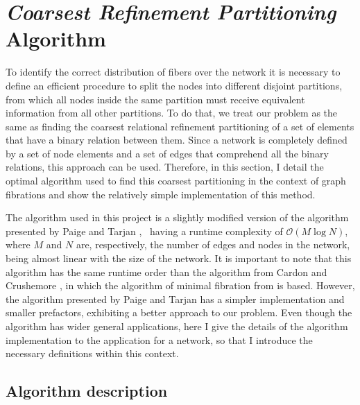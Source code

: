 \documentclass[12pt]{diazessay} %
\begin{document}

\section{\textit{Coarsest Refinement Partitioning }Algorithm}

To identify the correct distribution of fibers over the network it is necessary to define an efficient procedure to split the nodes into different disjoint partitions, from which all nodes inside the same partition must receive equivalent information from all other partitions. To do that, we treat our problem as the same as finding the coarsest relational refinement partitioning of a set of elements that have a binary relation between them. Since a network is completely defined by a set of node elements and a set of edges that comprehend all the binary relations, this approach can be used. Therefore, in this section, I detail the optimal algorithm used to find this coarsest partitioning in the context of graph fibrations and show the relatively simple implementation of this method.

The algorithm used in this project is a slightly modified version of the algorithm presented by Paige and Tarjan \cite{Tarjan1987}, \ having a runtime complexity of $\mathcal{O}(M\log N)$, where $M$ and $N$ are, respectively, the number of edges and nodes in the network, being almost linear with the size of the network. It is important to note that this algorithm has the same runtime order than the algorithm from Cardon and Crushemore \cite{Cardon1982}, in which the algorithm of minimal fibration from \cite{fibration2019} is based. However, the algorithm presented by Paige and Tarjan has a simpler implementation and smaller prefactors, exhibiting a better approach to our problem. Even though the algorithm has wider general applications, here I give the details of the algorithm implementation to the application for a network, so that I introduce the necessary definitions within this context.

\subsection{Algorithm description}
\end{document}
